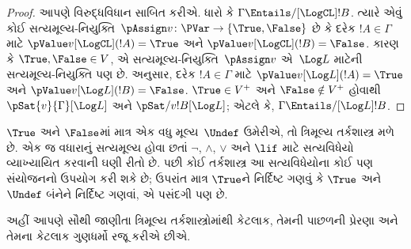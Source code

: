 \begin{proof}
  આપણે વિરુદ્ધવિધાન સાબિત કરીએ. ધારો કે $\Gamma \Entails/[\LogCL] !B$.
  ત્યારે એવું કોઈ સત્યમૂલ્ય-નિયુક્તિ~$\pAssign v\colon \PVar \to
  \{\True, \False\}$ છે કે દરેક $!A \in \Gamma$ માટે
  $\pValue v[\LogCL](!A) = \True$ અને
  $\pValue v[\LogCL](!B) = \False$. કારણ કે $\True,
  \False \in V$, એ સત્યમૂલ્ય-નિયુક્તિ~$\pAssign v$ એ~$\Log L$ માટેની
  સત્યમૂલ્ય-નિયુક્તિ પણ છે.  અનુસાર, દરેક
  $!A \in \Gamma$ માટે $\pValue v[\Log L](!A) =
  \True$ અને $\pValue v[\Log L](!B) = \False$.
  $\True \in V^+$ અને $\False \notin V^+$ હોવાથી
  $\pSat{v}{\Gamma}[\Log L]$ અને
  $\pSat/{v}{!B}[\Log L]$; એટલે કે,
  $\Gamma \Entails/[\Log L] !B$.
\end{proof}
\endgroup


\OLEndChapterHook
\endgroup


\begingroup
\makeatletter{}\makeatother

\label{guunit:OLP-0392}


\begingroup
\makeatletter{}\makeatother


\label{guunit:OLP-0393}


$\True$ અને $\False$માં માત્ર એક વધુ મૂલ્ય~$\Undef$ ઉમેરીએ,
તો ત્રિમૂલ્ય તર્કશાસ્ત્ર મળે છે. એક જ વધારાનું સત્યમૂલ્ય
હોવા છતાં $\lnot$, $\land$, $\lor$ અને $\lif$ માટે
સત્યવિધેયો વ્યાખ્યાયિત કરવાની ઘણી રીતો છે. પછી કોઈ
તર્કશાસ્ત્ર આ સત્યવિધેયોના કોઈ પણ સંયોજનનો ઉપયોગ કરી શકે છે;
ઉપરાંત માત્ર $\True$ને નિર્દિષ્ટ ગણવું કે $\True$ અને~$\Undef$
બંનેને નિર્દિષ્ટ ગણવાં, એ પસંદગી પણ છે.

અહીં આપણે સૌથી જાણીતા ત્રિમૂલ્ય તર્કશાસ્ત્રોમાંથી કેટલાક,
તેમની પાછળની પ્રેરણા અને તેમના કેટલાક ગુણધર્મો રજૂ કરીએ છીએ.
\endgroup


